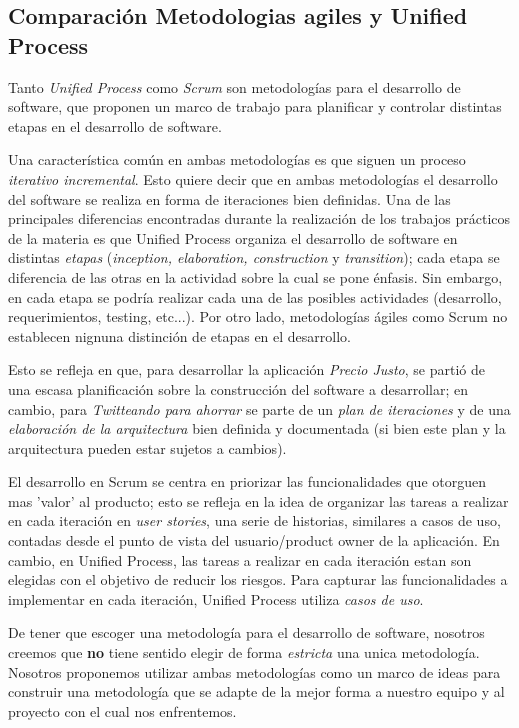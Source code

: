 \subsection{Comparación Metodologias agiles y Unified Process}

	Tanto \emph{Unified Process} como \emph{Scrum} son metodologías para el desarrollo de software, que proponen un marco de trabajo para planificar y controlar distintas etapas en el desarrollo de software.

	Una característica común en ambas metodologías es que siguen un proceso \emph{iterativo incremental}. Esto quiere decir que en ambas metodologías el desarrollo del software se realiza en forma de iteraciones bien definidas. Una de las principales diferencias encontradas durante la realización de los trabajos prácticos de la materia es que Unified Process organiza el desarrollo de software en distintas \emph{etapas} (\emph{inception, elaboration, construction} y \emph{transition}); cada etapa se diferencia de las otras en la actividad sobre la cual se pone énfasis. Sin embargo, en cada etapa se podría realizar cada una de las posibles actividades (desarrollo, requerimientos, testing, etc...). Por otro lado, metodologías ágiles como Scrum no establecen nignuna distinción de etapas en el desarrollo.

	Esto se refleja en que, para desarrollar la aplicación \emph{Precio Justo}, se partió de una escasa planificación sobre la construcción del software a desarrollar; en cambio, para \emph{Twitteando para ahorrar} se parte de un \emph{plan de iteraciones} y de una \emph{elaboración de la arquitectura} bien definida y documentada (si bien este plan y la arquitectura pueden estar sujetos a cambios).

	El desarrollo en Scrum se centra en priorizar las funcionalidades que otorguen mas 'valor' al producto; esto se refleja en la idea de organizar las tareas a realizar en cada iteración en \emph{user stories}, una serie de historias, similares a casos de uso, contadas desde el punto de vista del usuario/product owner de la aplicación. En cambio, en Unified Process, las tareas a realizar en cada iteración estan son elegidas con el objetivo de reducir los riesgos. Para capturar las funcionalidades a implementar en cada iteración, Unified Process utiliza \emph{casos de uso}.

	De tener que escoger una metodología para el desarrollo de software, nosotros creemos que \textbf{no} tiene sentido elegir de forma \emph{estricta} una unica metodología. Nosotros proponemos utilizar ambas metodologías como un marco de ideas para construir una metodología que se adapte de la mejor forma a nuestro equipo y al proyecto con el cual nos enfrentemos.


